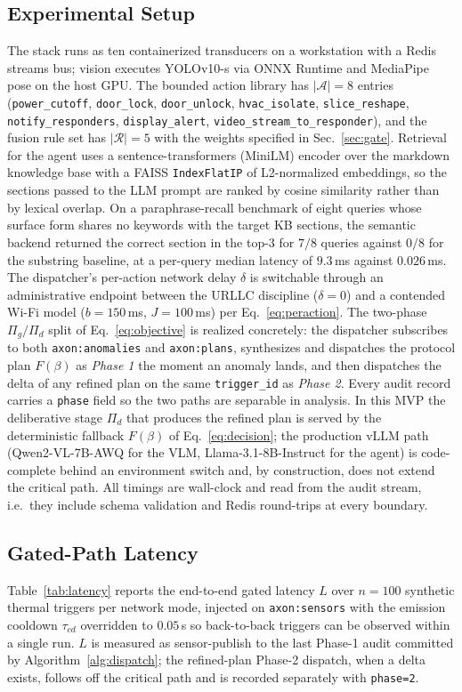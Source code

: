 \subsection{\textbf{Experimental Setup}}
\label{sec:res-setup}
The stack runs as ten containerized transducers on a workstation with a Redis
streams bus; vision executes YOLOv10-s via ONNX Runtime and MediaPipe pose on
the host GPU. The bounded action library has $|\mathcal{A}|=8$ entries
(\texttt{power\_cutoff}, \texttt{door\_lock}, \texttt{door\_unlock},
\texttt{hvac\_isolate}, \texttt{slice\_reshape}, \texttt{notify\_responders},
\texttt{display\_alert}, \texttt{video\_stream\_to\_responder}), and the fusion
rule set has $|\mathcal{R}|=5$ with the weights specified in
Sec.~\ref{sec:gate}. Retrieval for the agent uses a sentence-transformers
(MiniLM) encoder over the markdown knowledge base with a FAISS
\texttt{IndexFlatIP} of L2-normalized embeddings, so the sections passed to
the LLM prompt are ranked by cosine similarity rather than by lexical
overlap. On a paraphrase-recall benchmark of eight queries whose surface
form shares no keywords with the target KB sections, the semantic backend
returned the correct section in the top-3 for $7/8$ queries against $0/8$
for the substring baseline, at a per-query median latency of $9.3$\,ms
against $0.026$\,ms. The dispatcher's per-action network delay $\delta$ is switchable
through an administrative endpoint between the URLLC discipline
($\delta=0$) and a contended Wi-Fi model ($b=150$\,ms, $J=100$\,ms) per
Eq.~\eqref{eq:peraction}. The two-phase $\Pi_g/\Pi_d$ split of
Eq.~\eqref{eq:objective} is realized concretely: the dispatcher subscribes
to both \texttt{axon:anomalies} and \texttt{axon:plans}, synthesizes and
dispatches the protocol plan $F(\beta)$ as \emph{Phase 1} the moment an
anomaly lands, and then dispatches the delta of any refined plan on the
same \texttt{trigger\_id} as \emph{Phase 2}. Every audit record carries a
\texttt{phase} field so the two paths are separable in analysis. In this
MVP the deliberative stage $\Pi_d$ that produces the refined plan is served
by the deterministic fallback $F(\beta)$ of Eq.~\eqref{eq:decision}; the
production vLLM path (Qwen2-VL-7B-AWQ for the VLM, Llama-3.1-8B-Instruct for
the agent) is code-complete behind an environment switch and, by
construction, does not extend the critical path. All timings are wall-clock
and read from the audit stream, i.e.\ they include schema validation and
Redis round-trips at every boundary.

\subsection{\textbf{Gated-Path Latency}}
\label{sec:res-latency}
Table~\ref{tab:latency} reports the end-to-end gated latency $L$ over $n=100$
synthetic thermal triggers per network mode, injected on
\texttt{axon:sensors} with the emission cooldown $\tau_{cd}$ overridden to
$0.05$\,s so back-to-back triggers can be observed within a single run. $L$
is measured as sensor-publish to the last Phase-1 audit committed by
Algorithm~\ref{alg:dispatch}; the refined-plan Phase-2 dispatch, when a
delta exists, follows off the critical path and is recorded separately with
\texttt{phase=2}.

